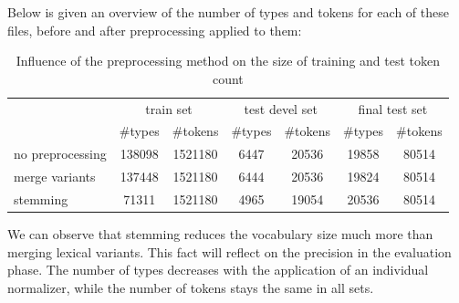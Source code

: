 Below is given an overview of the number of types and tokens for each of these files, before and after 
preprocessing applied to them:

\begin{table}[h!]
\begin{tabular}{ l | c c | c c | c c|}
& \multicolumn{2}{|c}{train set} & \multicolumn{2}{|c}{test devel set} & \multicolumn{2}{|c|}{final test set} \\
   &  \#types & \#tokens  &  \#types & \#tokens  &  \#types & \#tokens \\
  \hline                       
no preprocessing &138098 & 1521180 & 6447 & 20536 & 19858 & 80514 \\ 
 merge variants &137448 & 1521180 & 6444 & 20536 & 19824 & 80514 \\ 
stemming &71311 & 1521180 & 4965 & 19054 & 20536 & 80514 \\ 
\end{tabular}
\caption{Influence of the preprocessing method on the size of training and test token count}
\end{table}
We can observe that stemming reduces the vocabulary size much more than merging 
lexical variants. This fact will reflect on the precision in the evaluation phase. The number of types decreases with the application of an individual normalizer, while the number of tokens stays the same in all sets. 

